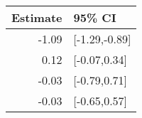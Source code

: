 \begin{tabular}{rl}
  \hline
Estimate & 95\% CI \\ 
  \hline
-1.09 & [-1.29,-0.89] \\ 
  0.12 & [-0.07,0.34] \\ 
  -0.03 & [-0.79,0.71] \\ 
  -0.03 & [-0.65,0.57] \\ 
   \hline
\end{tabular}

